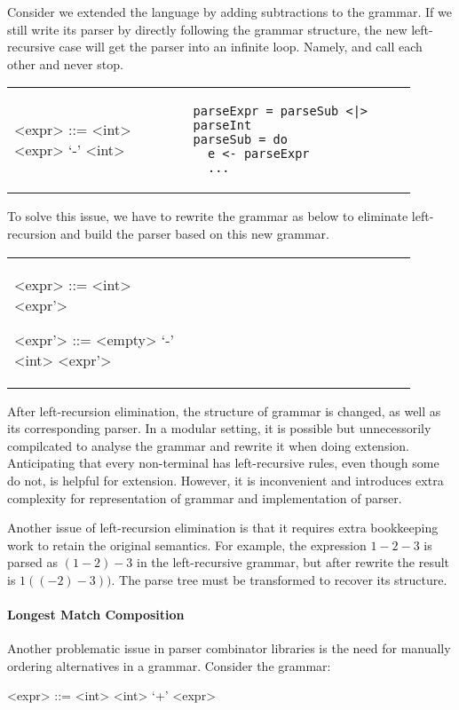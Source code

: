Consider we extended the language by adding subtractions to the grammar. If we still write its parser by directly following the grammar structure, the new left-recursive case will get the parser into an infinite loop. Namely,  and  call each other and never stop.

\begin{tabular}{m{0.4\linewidth}m{0.5\linewidth}}
\setlength{\grammarindent}{5em}
\begin{grammar}
<expr> ::= <int> \alt <expr> `-' <int>
\end{grammar}
&
\begin{lstlisting}[language=PlainCode]
parseExpr = parseSub <|> parseInt
parseSub = do
  e <- parseExpr
  ...
\end{lstlisting}
\end{tabular}

To solve this issue, we have to rewrite the grammar as below to eliminate left-recursion and build the parser based on this new grammar.\\

\begin{tabular}{m{0.4\linewidth}m{0.5\linewidth}}
\setlength{\grammarindent}{5em}
\begin{grammar}
<expr> ::= <int> <expr'>

<expr'> ::= <empty> \alt `-' <int> <expr'>
\end{grammar}
&
\end{tabular}

After left-recursion elimination, the structure of grammar is changed, as well as its corresponding parser. In a modular setting, it is possible but unnecessorily compilcated to analyse the grammar and rewrite it when doing extension. Anticipating that every non-terminal has left-recursive rules, even though some do not, is helpful for extension. However, it is inconvenient and introduces extra complexity for representation of grammar and implementation of parser.

Another issue of left-recursion elimination is that it requires extra
bookkeeping work to retain the original semantics. For example, the
expression $1-2-3$ is parsed as $(1-2)-3$ in the left-recursive
grammar, but after rewrite the result is $1((-2)-3))$. The parse tree
must be transformed to recover its structure.

\paragraph{Longest Match Composition} Another problematic issue
in parser combinator libraries is the need for manually ordering
alternatives in a grammar.
Consider the grammar:
\setlength{\grammarindent}{5em}
\begin{grammar}
<expr> ::= <int> \alt <int> `+' <expr>
\end{grammar}

